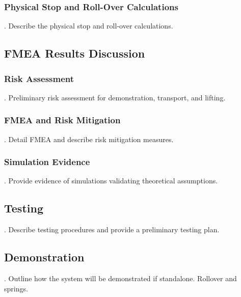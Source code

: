 \subsubsection{Physical Stop and Roll-Over Calculations}
.  Describe the physical stop and roll-over calculations.

\subsection{FMEA Results Discussion}
\subsubsection{Risk Assessment}
.  Preliminary risk assessment for demonstration, transport, and lifting.
\subsubsection{FMEA and Risk Mitigation}
.  Detail FMEA and describe risk mitigation measures.
\subsubsection{Simulation Evidence}
.  Provide evidence of simulations validating theoretical assumptions.

\subsection{Testing}
.  Describe testing procedures and provide a preliminary testing plan.

\subsection{Demonstration}
.  Outline how the system will be demonstrated if standalone. Rollover and springs.
\newpage